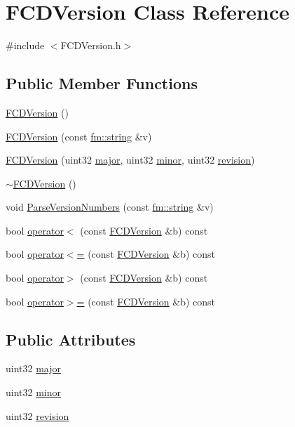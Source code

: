 \hypertarget{classFCDVersion}{
\section{FCDVersion Class Reference}
\label{classFCDVersion}
}


{\ttfamily \#include $<$FCDVersion.h$>$}

\subsection*{Public Member Functions}
\begin{DoxyCompactItemize}
\item 
\hyperlink{classFCDVersion_aabd470c6d19ddb7ff287ab601d344a21}{FCDVersion} ()
\item 
\hyperlink{classFCDVersion_a59ac2d2b345da3aa81fd5353a321792a}{FCDVersion} (const \hyperlink{classfm_1_1stringT}{fm::string} \&v)
\item 
\hyperlink{classFCDVersion_af12b625017f133c10a0dba3c780340e5}{FCDVersion} (uint32 \hyperlink{classFCDVersion_ad2508c7e5740ba8f03a0afe18bb9c7b5}{major}, uint32 \hyperlink{classFCDVersion_a7fa0db1f60be770ccff8ff93c3e11deb}{minor}, uint32 \hyperlink{classFCDVersion_a24a8596d2fa8ebfbb5866abb7be4801c}{revision})
\item 
\hyperlink{classFCDVersion_acb581433e7ac673c5b53d2a52afa4471}{$\sim$FCDVersion} ()
\item 
void \hyperlink{classFCDVersion_ad5677d5ab3fc13182e1385b209856cf9}{ParseVersionNumbers} (const \hyperlink{classfm_1_1stringT}{fm::string} \&v)
\item 
bool \hyperlink{classFCDVersion_a2ecd2a362323743defbf4134010c0df6}{operator$<$} (const \hyperlink{classFCDVersion}{FCDVersion} \&b) const 
\item 
bool \hyperlink{classFCDVersion_aa38153b38b9512d1101a6b3557d56f7d}{operator$<$=} (const \hyperlink{classFCDVersion}{FCDVersion} \&b) const 
\item 
bool \hyperlink{classFCDVersion_a9f1a163cee576efb2cf2e18659368fdf}{operator$>$} (const \hyperlink{classFCDVersion}{FCDVersion} \&b) const 
\item 
bool \hyperlink{classFCDVersion_a9ff11e9ff8690123f22b87d3de2591d4}{operator$>$=} (const \hyperlink{classFCDVersion}{FCDVersion} \&b) const 
\end{DoxyCompactItemize}
\subsection*{Public Attributes}
\begin{DoxyCompactItemize}
\item 
uint32 \hyperlink{classFCDVersion_ad2508c7e5740ba8f03a0afe18bb9c7b5}{major}
\item 
uint32 \hyperlink{classFCDVersion_a7fa0db1f60be770ccff8ff93c3e11deb}{minor}
\item 
uint32 \hyperlink{classFCDVersion_a24a8596d2fa8ebfbb5866abb7be4801c}{revision}
\end{DoxyCompactItemize}

